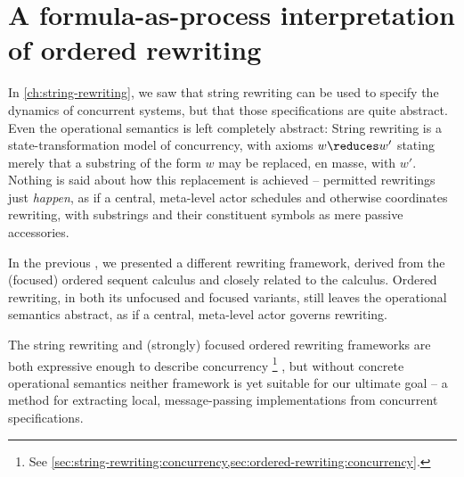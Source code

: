 \chapter{A formula-as-process interpretation of ordered rewriting}\label{ch:formula-as-process}



In \cref{ch:string-rewriting}, we saw that string rewriting can be used to specify the dynamics of concurrent systems, but that those specifications are quite abstract.
Even the operational semantics is left completely abstract:
String rewriting is a state-transformation model of concurrency, with axioms $w \reduces w'$
stating merely that a substring of the form $w$ may be replaced, en masse, with $w'$.
Nothing is said about how this replacement is achieved -- permitted rewritings just \emph{happen}, as if a central, meta-level actor schedules and otherwise coordinates rewriting, with substrings and their constituent symbols as mere passive accessories.

In the previous , we presented a different rewriting framework, derived from the (focused) ordered sequent calculus and closely related to the \citeauthor{Lambek:AMM58} calculus\autocite{Lambek:AMM58}.
Ordered rewriting, in both its unfocused and focused variants, still leaves the operational semantics abstract, as if a central, meta-level actor governs rewriting.

The string rewriting and (strongly) focused ordered rewriting frameworks are both expressive enough to describe concurrency%
\footnote{See \cref{sec:string-rewriting:concurrency,sec:ordered-rewriting:concurrency}.}%
, but without concrete operational semantics neither framework is yet suitable for our ultimate goal -- a method for extracting local, message-passing implementations from concurrent specifications.


